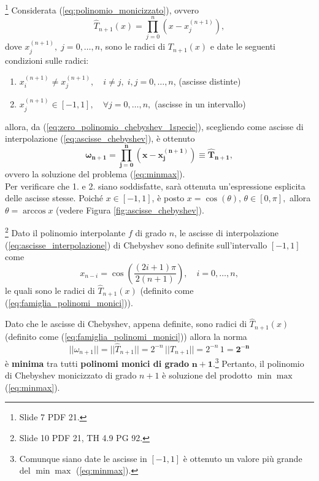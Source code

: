 \begin{remark}\label{re:ver1&2}\footnote{Slide 7 PDF 21.}
	Considerata (\ref{eq:polinomio_monicizzato}), ovvero
	\begin{equation*}
		\widehat T_{n+1}(x)=\prod_{j=0}^n\left(x-x_j^{(n+1)}\right),
	\end{equation*} 
	dove $x_j^{(n+1)},\; j=0,\hdots,n$, sono le radici di $T_{n+1}(x)$ e date le seguenti condizioni sulle radici:
	\begin{enumerate}
		\item $x_i^{(n+1)}\neq x_j^{(n+1)},\quad i\neq j,\; i,j=0,\hdots,n$, (ascisse distinte)
		\item $x_j^{(n+1)}\in [-1,1],\quad \forall j=0,\hdots,n,$ (ascisse in un intervallo)
	\end{enumerate}
	allora, da (\ref{eq:zero_polinomio_chebyshev_1specie}), scegliendo come ascisse di interpolazione (\ref{eq:ascisse_chebyshev}), è ottenuto
	\begin{equation*}
		\boldsymbol{\omega_{n+1}=\prod_{j=0}^{n}\left(x-x_j^{(n+1)}\right)\equiv\widehat T_{n+1}},
	\end{equation*}
	ovvero la soluzione del problema (\ref{eq:minmax}).\\
	Per verificare che 1. e 2. siano soddisfatte, sarà ottenuta un'espressione esplicita delle ascisse stesse. Poiché $x\in [-1,1]$, è posto $x=\cos(\theta),\, \theta\in [0,\pi],$ allora $\theta=\arccos{x}$ (vedere Figura \ref{fig:ascisse_chebyshev}).
\end{remark}

\begin{definition}\footnote{Slide 10 PDF 21, TH 4.9 PG 92.}
    Dato il polinomio interpolante $f$ di grado $n$, le ascisse di interpolazione (\ref{eq:ascisse_interpolazione}) di Chebyshev sono definite sull'intervallo $[-1, 1]$ come
    \begin{equation}\label{eq:ascisse_chebyshev}
        x_{n-i}=\cos{\left(\frac{(2i+1)\pi}{2(n+1)}\right)},\quad i=0,\hdots,n,
    \end{equation}
    le quali sono le radici di $\widehat T_{n+1}(x)$ (definito come (\ref{eq:famiglia_polinomi_monici})).
\end{definition}

Dato che le ascisse di Chebyshev, appena definite, sono radici di $\widehat T_{n+1}(x)$ (definito come (\ref{eq:famiglia_polinomi_monici})) allora la norma
\begin{equation*}
    ||\omega_{n+1}||=||\widehat T_{n+1}||=2^{-n}\,||T_{n+1}||=2^{-n}\, 1 = \boldsymbol{2^{-n}}
\end{equation*}
è \textbf{minima} tra tutti \textbf{polinomi monici di grado} $\boldsymbol{n+1}$.\footnote{Comunque siano date le ascisse in $[-1,1]$ è ottenuto un valore più grande del $\min\max$ (\ref{eq:minmax}).} Pertanto, il polinomio di Chebyshev monicizzato di grado $n+1$ è soluzione del prodotto $\min\max$ (\ref{eq:minmax}). 

